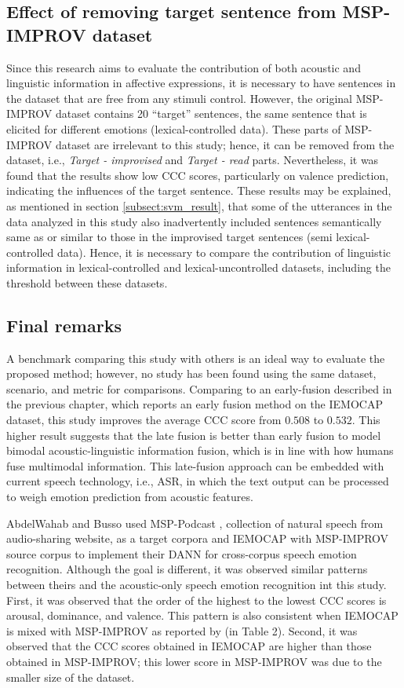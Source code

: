\subsection{Effect of removing target sentence from MSP-IMPROV dataset}
Since this research aims to evaluate the contribution of both acoustic and
linguistic information in affective expressions, it is necessary to have
sentences in the dataset that are free from any stimuli control. However, the
original MSP-IMPROV dataset contains 20 ``target'' sentences, the same sentence
that is elicited for different emotions (lexical-controlled data). These parts
of MSP-IMPROV dataset are irrelevant to this study; hence, it can be removed
from the dataset, i.e., \textit{Target - improvised} and \textit{Target - read}
parts. Nevertheless, it was found that the results show low CCC scores,
particularly on valence prediction, indicating the influences of the target
sentence. These results may be explained, as mentioned in section
\ref{subsect:svm_result}, that some of the utterances in the data analyzed in
this study also inadvertently included sentences semantically same as or
similar to those in the improvised target sentences (semi lexical-controlled
data). Hence, it is necessary to compare the contribution of linguistic
information in lexical-controlled and lexical-uncontrolled datasets, including
the threshold between these datasets.

\subsection{Final remarks}
A benchmark comparing this study with others is an ideal way to evaluate the
proposed method; however, no study has been found using the same dataset,
scenario, and metric for comparisons. Comparing to an early-fusion described in
the previous chapter, which reports an early fusion method on the IEMOCAP
dataset, this study improves the average CCC score from $0.508$ to $0.532$.
This higher result suggests that the late fusion is better than early fusion to
model bimodal acoustic-linguistic information fusion, which is in line with how
humans fuse multimodal information. This late-fusion approach can be embedded
with current speech technology, i.e., ASR, in which the text output can be
processed to weigh emotion prediction from acoustic features.

AbdelWahab and Busso \cite{Abdelwahab2018} used MSP-Podcast \cite{Lotfian2019},
collection of natural speech from audio-sharing website, as a target corpora
and IEMOCAP with MSP-IMPROV source corpus to implement their DANN for
cross-corpus speech emotion recognition.  Although the goal is different, it
was observed similar patterns between theirs and the acoustic-only speech
emotion recognition int this study.  First, it was observed that the order of
the highest to the lowest CCC scores is arousal, dominance, and valence. This
pattern is also consistent when IEMOCAP is mixed with MSP-IMPROV as reported by
\cite{parthasarathy2017jointly} (in Table 2).  Second, it was observed that the
CCC scores obtained in IEMOCAP are higher than those obtained in MSP-IMPROV;
this lower score in MSP-IMPROV was due to the smaller size of the dataset. 

